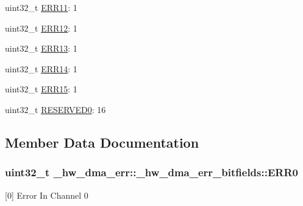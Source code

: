 \begin{DoxyCompactItemize}
\item 
uint32\+\_\+t \hyperlink{struct__hw__dma__err_1_1__hw__dma__err__bitfields_a9df58a5aa0247f5785c357452464603a}{E\+R\+R11}\+: 1
\item 
uint32\+\_\+t \hyperlink{struct__hw__dma__err_1_1__hw__dma__err__bitfields_aaebeac066634ea7d1e693ee93df6ae15}{E\+R\+R12}\+: 1
\item 
uint32\+\_\+t \hyperlink{struct__hw__dma__err_1_1__hw__dma__err__bitfields_a41df013a2b749e7361e049789a005939}{E\+R\+R13}\+: 1
\item 
uint32\+\_\+t \hyperlink{struct__hw__dma__err_1_1__hw__dma__err__bitfields_a969076201009dcf576af28c4cd1bb8b2}{E\+R\+R14}\+: 1
\item 
uint32\+\_\+t \hyperlink{struct__hw__dma__err_1_1__hw__dma__err__bitfields_a73cc870ffc5d41fafd030e17e75552f4}{E\+R\+R15}\+: 1
\item 
uint32\+\_\+t \hyperlink{struct__hw__dma__err_1_1__hw__dma__err__bitfields_a7b7f1e36a3294f00c26398ba66650a02}{R\+E\+S\+E\+R\+V\+E\+D0}\+: 16
\end{DoxyCompactItemize}


\subsection{Member Data Documentation}
\subsubsection[{\texorpdfstring{E\+R\+R0}{ERR0}}]{\setlength{\rightskip}{0pt plus 5cm}uint32\+\_\+t \+\_\+hw\+\_\+dma\+\_\+err\+::\+\_\+hw\+\_\+dma\+\_\+err\+\_\+bitfields\+::\+E\+R\+R0}\hypertarget{struct__hw__dma__err_1_1__hw__dma__err__bitfields_a990e0dc2cfba57f9dc88f3db746acc46}{}\label{struct__hw__dma__err_1_1__hw__dma__err__bitfields_a990e0dc2cfba57f9dc88f3db746acc46}
\mbox{[}0\mbox{]} Error In Channel 0 
